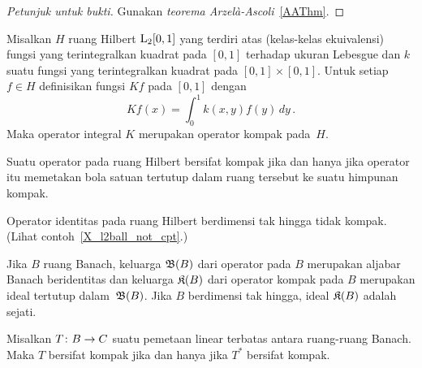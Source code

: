 \begin{proof}[\emph{Petunjuk untuk bukti}] Gunakan \emph{teorema Arzel\`a-Ascoli}~\ref{AAThm}.  \ns
\end{proof}

\begin{exam}\label{X_square_int_kernel} Misalkan $H$ ruang Hilbert $\mathrm{L_{2}}{[0,1]}$ yang terdiri atas (kelas-kelas ekuivalensi) fungsi yang
terintegralkan kuadrat pada $[0,1]$ terhadap ukuran Lebesgue dan
$k$ suatu fungsi yang terintegralkan kuadrat
pada $[0,1] \times [0,1]$.  Untuk setiap $f \in H$ definisikan fungsi $Kf$ pada $[0,1]$ dengan
   \[ Kf(x) = \int_0^1 k(x,y)f(y)\,dy\,. \]
Maka operator integral $K$ merupakan operator kompak pada~$H$.
\end{exam}

\begin{prop} Suatu operator pada ruang Hilbert bersifat kompak jika dan hanya jika operator itu memetakan bola satuan tertutup dalam ruang tersebut
ke suatu himpunan kompak.
\end{prop}

\begin{cor}\label{cor_id_op_not_cpt} Operator identitas pada ruang Hilbert berdimensi tak hingga tidak kompak.
(Lihat contoh~\ref{X_l2ball_not_cpt}.)
\end{cor}

\begin{exam} Jika $B$ ruang Banach, keluarga $\mathfrak{B}(B)$ dari operator pada $B$ merupakan
aljabar Banach beridentitas dan
keluarga $\mathfrak{K}(B)$ dari operator kompak pada $B$ merupakan ideal tertutup dalam~$\mathfrak{B}(B)$.
Jika $B$ berdimensi tak hingga, ideal $\mathfrak{K}(B)$ adalah sejati.
\end{exam}

\begin{prop} Misalkan $T\colon B \rightarrow C$ suatu pemetaan linear terbatas antara ruang-ruang Banach. Maka $T$ bersifat kompak
jika dan hanya jika $T^*$ bersifat kompak.
\end{prop}


